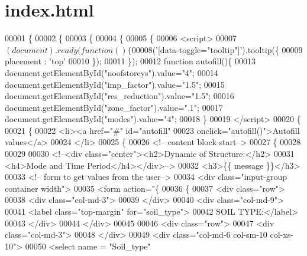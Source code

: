 \hypertarget{index_8html_source}{}\section{index.\+html}
\label{index_8html_source}

\begin{DoxyCode}
00001 \{%
00002 \{%
00003 \{%
00004 \{%
00005 \{%
00006     <script>
00007         $(document).ready(function()\{
00008              $('[data-toggle="tooltip"]').tooltip(\{
00009                  placement : 'top'
00010              \});
00011         \});
00012         function autofill()\{
00013             document.getElementById("noofstoreys").value="4";
00014             document.getElementById("imp\_factor").value="1.5";
00015             document.getElementById("res\_reduction").value="1.5";
00016             document.getElementById("zone\_factor").value=".1";
00017             document.getElementById("modes").value="4";
00018         \}
00019     </script>
00020     \{%
00021     \{%
00022         <li><a href="#" id="autofill"
00023             onclick="autofill()">Autofill values</a>
00024         </li>
00025     \{%
00026    <!-- content block start-->
00027     \{%
00028 
00029 
00030         <!--<div class="center"><h2>Dynamic of Structure:</h2>
00031             <h4>Mode and Time Period</h4></div>-->
00032         <h3>\{\{ message \}\}</h3>
00033        <!-- form to get values from the user-->
00034        <div class="input-group container width">
00035            <form action="\{%
00036                \{%
00037                 <div class="row">
00038                     <div class="col-md-3">
00039                     </div>
00040                     <div class="col-md-9">
00041                         <label class="top-margin" for="soil\_type">
00042                             SOIL TYPE:</label>
00043                     </div>
00044                 </div>
00045                 
00046                 <div class="row">
00047                     <div class="col-md-3">
00048                     </div>
00049                     <div class="col-md-6 col-sm-10 col-xs-10">
00050                         <select name = "Soil\_type"

\end{DoxyCode}
